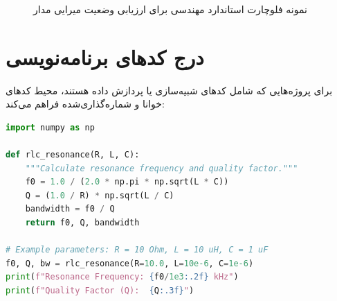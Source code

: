 \documentclass[12pt,a4paper]{article}
\begin{document}
\begin{figure}[H]
    \centering
    \caption{نمونه فلوچارت استاندارد مهندسی برای ارزیابی وضعیت میرایی مدار}
    \label{fig:flowchart_demo}
\end{figure}

\vspace{0.4cm}

\section{درج کدهای برنامه‌نویسی}
برای پروژه‌هایی که شامل کدهای شبیه‌سازی یا پردازش داده هستند، محیط  کدهای خوانا و شماره‌گذاری‌شده فراهم می‌کند:

\begin{latin}
\begin{lstlisting}[language=Python, caption={Sample Python code for RLC resonance and quality factor}]
import numpy as np

def rlc_resonance(R, L, C):
    """Calculate resonance frequency and quality factor."""
    f0 = 1.0 / (2.0 * np.pi * np.sqrt(L * C))
    Q = (1.0 / R) * np.sqrt(L / C)
    bandwidth = f0 / Q
    return f0, Q, bandwidth

# Example parameters: R = 10 Ohm, L = 10 uH, C = 1 uF
f0, Q, bw = rlc_resonance(R=10.0, L=10e-6, C=1e-6)
print(f"Resonance Frequency: {f0/1e3:.2f} kHz")
print(f"Quality Factor (Q):  {Q:.3f}")
\end{lstlisting}
\end{latin}
\end{document}
